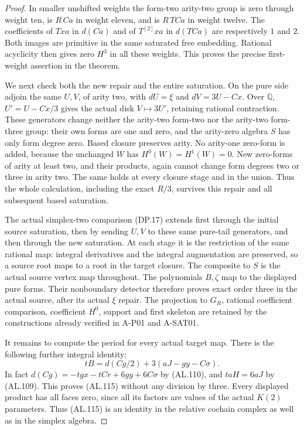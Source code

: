 \begin{proof}
In smaller unshifted weights the form-two arity-two group
is zero through weight ten, is $R\,Ca$ in weight eleven,
and is $R\,TCa$ in weight twelve.
The coefficients of $Txa$ in $d(Ca)$ and of
$T^{[2]}xa$ in $d(TCa)$ are respectively $1$ and $2$.
Both images are primitive in the same saturated free embedding.
Rational acyclicity then gives zero $H^3$ in all these weights.
This proves the precise first-weight assertion in the theorem.

We next check both the new repair and the entire saturation.
On the pure side adjoin the same $U,V$, of arity two,
with $dU=\xi$ and $dV=3U-Cx$.
Over $\mathbb Q$, $U'=U-Cx/3$ gives the actual disk
$V\mapsto3U'$, retaining rational contraction.
These generators change neither the arity-two form-two
nor the arity-two form-three group: their own forms are
one and zero, and the arity-zero algebra $S$ has only
form degree zero. Based closure preserves arity.
No arity-one zero-form is added, because the unchanged
$W$ has $H^0(W)=H^1(W)=0$.
New zero-forms of arity at least two, and their products,
again cannot change form degrees two or three in arity two.
The same holds at every closure stage and in the union.
Thus the whole calculation, including the exact $R/3$,
survives this repair and all subsequent based saturation.

The actual simplex-two comparison (DP.17) extends first
through the initial source saturation, then by sending
$U,V$ to these same pure-tail generators, and then through
the new saturation. At each stage it is the restriction
of the same rational map: integral derivatives and the
integral augmentation are preserved, so a source root
maps to a root in the target closure. The composite to
$S$ is the actual source vertex map throughout.
The polynomials $B,\zeta$ map to the displayed pure forms.
Their nonboundary detector therefore proves exact order
three in the actual source, after its actual $\xi$ repair.
The projection to $G_R$, rational coefficient comparison,
coefficient $H^0$, support and first skeleton are retained
by the constructions already verified in A-P01 and A-SAT01.

It remains to compute the period for every actual target map.
There is the following further integral identity:
\[
          tB=d(Cg/2)+3(aJ-gy-C\sigma).
 \tag{AL.115}
\]
In fact $d(Cg)=-tgx-tCr+6gy+6C\sigma$ by (AL.110),
and $taH=6aJ$ by (AL.109). This proves (AL.115)
without any division by three.
Every displayed product has all faces zero, since all
its factors are values of the actual $K(2)$ parameters.
Thus (AL.115) is an identity in the relative cochain
complex as well as in the simplex algebra.


\end{proof}
